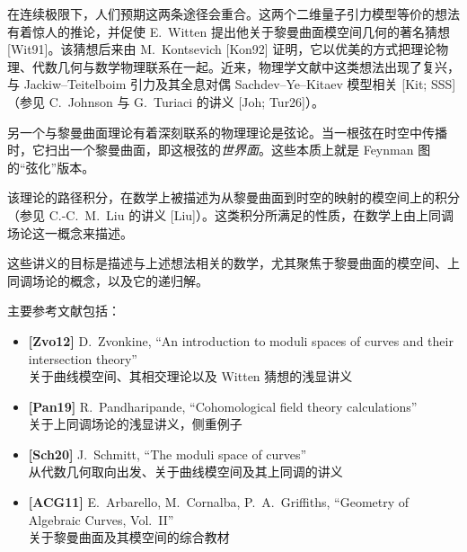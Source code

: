 在连续极限下，人们预期这两条途径会重合。这两个二维量子引力模型等价的想法有着惊人的推论，并促使 E.~Witten 提出他关于黎曼曲面模空间几何的著名猜想 [Wit91]。该猜想后来由 M.~Kontsevich [Kon92] 证明，它以优美的方式把理论物理、代数几何与数学物理联系在一起。近来，物理学文献中这类想法出现了复兴，与 Jackiw--Teitelboim 引力及其全息对偶 Sachdev--Ye--Kitaev 模型相关 [Kit; SSS]（参见 C.~Johnson 与 G.~Turiaci 的讲义 [Joh; Tur26]）。



另一个与黎曼曲面理论有着深刻联系的物理理论是弦论。当一根弦在时空中传播时，它扫出一个黎曼曲面，即这根弦的\emph{世界面}。这些本质上就是 Feynman 图的“弦化”版本。


该理论的路径积分，在数学上被描述为从黎曼曲面到时空的映射的模空间上的积分（参见 C.-C.~M.~Liu 的讲义 [Liu]）。这类积分所满足的性质，在数学上由上同调场论这一概念来描述。

这些讲义的目标是描述与上述想法相关的数学，尤其聚焦于黎曼曲面的模空间、上同调场论的概念，以及它的递归解。


主要参考文献包括：

\begin{itemize}[leftmargin=1.5em,itemsep=0.55em,label={}]
  \item \textbf{[Zvo12]} D.~Zvonkine, ``An introduction to moduli spaces of curves and their intersection theory''
        \\[1pt] {\small\kaishu 关于曲线模空间、其相交理论以及 Witten 猜想的浅显讲义}
  \item \textbf{[Pan19]} R.~Pandharipande, ``Cohomological field theory calculations''
        \\[1pt] {\small\kaishu 关于上同调场论的浅显讲义，侧重例子}
  \item \textbf{[Sch20]} J.~Schmitt, ``The moduli space of curves''
        \\[1pt] {\small\kaishu 从代数几何取向出发、关于曲线模空间及其上同调的讲义}
  \item \textbf{[ACG11]} E.~Arbarello, M.~Cornalba, P.~A.~Griffiths, ``Geometry of Algebraic Curves, Vol.~II''
        \\[1pt] {\small\kaishu 关于黎曼曲面及其模空间的综合教材}
\end{itemize}

